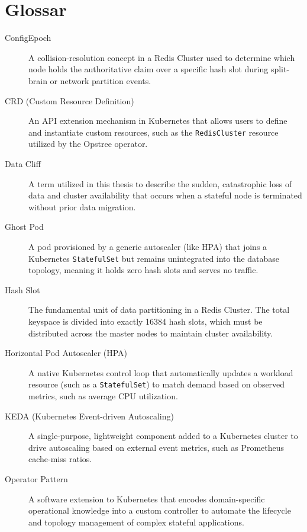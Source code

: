\documentclass[12pt,a4paper]{report}
\begin{document}
\section*{Glossar}
\begin{description}

    \item[ConfigEpoch] A collision-resolution concept in a Redis Cluster used to determine which node holds the authoritative claim over a specific hash slot during split-brain or network partition events.
    
    \item[CRD (Custom Resource Definition)] An API extension mechanism in Kubernetes that allows users to define and instantiate custom resources, such as the \texttt{RedisCluster} resource utilized by the Opstree operator.
    
    \item[Data Cliff] A term utilized in this thesis to describe the sudden, catastrophic loss of data and cluster availability that occurs when a stateful node is terminated without prior data migration.
    
    \item[Ghost Pod] A pod provisioned by a generic autoscaler (like HPA) that joins a Kubernetes \texttt{StatefulSet} but remains unintegrated into the database topology, meaning it holds zero hash slots and serves no traffic.
    
    \item[Hash Slot] The fundamental unit of data partitioning in a Redis Cluster. The total keyspace is divided into exactly \num{16384} hash slots, which must be distributed across the master nodes to maintain cluster availability.
    
    \item[Horizontal Pod Autoscaler (HPA)] A native Kubernetes control loop that automatically updates a workload resource (such as a \texttt{StatefulSet}) to match demand based on observed metrics, such as average CPU utilization.
    
    \item[KEDA (Kubernetes Event-driven Autoscaling)] A single-purpose, lightweight component added to a Kubernetes cluster to drive autoscaling based on external event metrics, such as Prometheus cache-miss ratios.
    
    \item[Operator Pattern] A software extension to Kubernetes that encodes domain-specific operational knowledge into a custom controller to automate the lifecycle and topology management of complex stateful applications.
    

\end{description}
\end{document}
